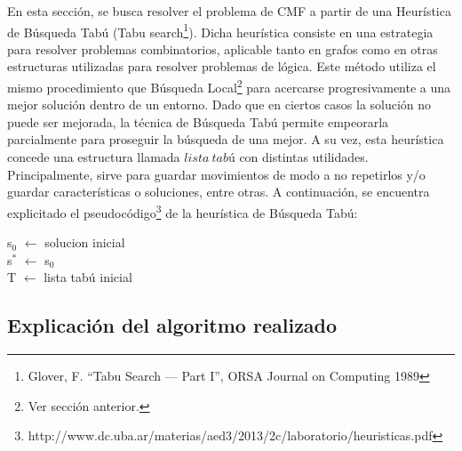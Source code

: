 En esta sección, se busca resolver el problema de CMF a partir de una Heurística de Búsqueda Tabú (Tabu search\footnote{Glover, F. ``Tabu Search — Part I'', ORSA Journal on Computing 1989}). Dicha heurística consiste en una estrategia para resolver problemas combinatorios, aplicable tanto en grafos como en otras estructuras utilizadas para resolver problemas de lógica. Este método utiliza el mismo procedimiento que Búsqueda Local\footnote{Ver sección anterior.} para acercarse progresivamente a una mejor solución dentro de un entorno. Dado que en ciertos casos la solución no puede ser mejorada, la técnica de Búsqueda Tabú permite empeorarla parcialmente para proseguir la búsqueda de una mejor. A su vez, esta heurística concede una estructura llamada $lista\ tabú$ con distintas utilidades. Principalmente, sirve para guardar movimientos de modo a no repetirlos y/o guardar características o soluciones, entre otras. A continuación, se encuentra explicitado el pseudocódigo\footnote{http://www.dc.uba.ar/materias/aed3/2013/2c/laboratorio/heuristicas.pdf} de la heurística de Búsqueda Tabú:

\begin{algorithm}[H]
\SetAlgoLined
s$_{0}$ $\leftarrow$ solucion inicial \\
s$^{*}$ $\leftarrow$ s$_{0}$ \\
T $\leftarrow$ lista tabú inicial \\
\end{algorithm}

\subsection{Explicación del algoritmo realizado}

